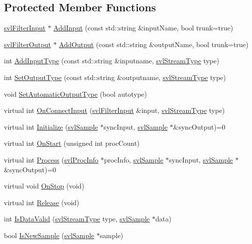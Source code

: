 \subsection*{Protected Member Functions}
\begin{DoxyCompactItemize}
\item 
\hyperlink{classsvl_filter_input}{svl\-Filter\-Input} $\ast$ \hyperlink{classsvl_filter_base_adce77c7bb49b299969eb0e00424a21de}{Add\-Input} (const std\-::string \&input\-Name, bool trunk=true)
\item 
\hyperlink{classsvl_filter_output}{svl\-Filter\-Output} $\ast$ \hyperlink{classsvl_filter_base_ac18bdc542bce9ef47ee7f612fb258041}{Add\-Output} (const std\-::string \&output\-Name, bool trunk=true)
\item 
int \hyperlink{classsvl_filter_base_abf749c32928ce1a0508b92aa2f15db32}{Add\-Input\-Type} (const std\-::string \&inputname, \hyperlink{svl_definitions_8h_aa00696d338a58db361335a01fd11e122}{svl\-Stream\-Type} type)
\item 
int \hyperlink{classsvl_filter_base_a5c51974427db1f5b8ec126c8c80fa1d7}{Set\-Output\-Type} (const std\-::string \&outputname, \hyperlink{svl_definitions_8h_aa00696d338a58db361335a01fd11e122}{svl\-Stream\-Type} type)
\item 
void \hyperlink{classsvl_filter_base_a3f8963a400373d4cd0957d3fc796ac10}{Set\-Automatic\-Output\-Type} (bool autotype)
\item 
virtual int \hyperlink{classsvl_filter_base_a7716e657fb8b592cbf31ad78cdb4c0e7}{On\-Connect\-Input} (\hyperlink{classsvl_filter_input}{svl\-Filter\-Input} \&input, \hyperlink{svl_definitions_8h_aa00696d338a58db361335a01fd11e122}{svl\-Stream\-Type} type)
\item 
virtual int \hyperlink{classsvl_filter_base_ac8eddcd9336c2b381facc8fb372e3bfb}{Initialize} (\hyperlink{classsvl_sample}{svl\-Sample} $\ast$sync\-Input, \hyperlink{classsvl_sample}{svl\-Sample} $\ast$\&sync\-Output)=0
\item 
virtual int \hyperlink{classsvl_filter_base_ad94fe80295839717e45117031e5cf60d}{On\-Start} (unsigned int proc\-Count)
\item 
virtual int \hyperlink{classsvl_filter_base_aaff77d711088384d00e717fb4ec88aab}{Process} (\hyperlink{structsvl_proc_info}{svl\-Proc\-Info} $\ast$proc\-Info, \hyperlink{classsvl_sample}{svl\-Sample} $\ast$sync\-Input, \hyperlink{classsvl_sample}{svl\-Sample} $\ast$\&sync\-Output)=0
\item 
virtual void \hyperlink{classsvl_filter_base_adf99599f927bf2934c9b4059e9dc2ed1}{On\-Stop} (void)
\item 
virtual int \hyperlink{classsvl_filter_base_ab689b852e2cee497fcd0ca6708105e17}{Release} (void)
\item 
int \hyperlink{classsvl_filter_base_ab26bdd0871500e75ceb34fe82da700ed}{Is\-Data\-Valid} (\hyperlink{svl_definitions_8h_aa00696d338a58db361335a01fd11e122}{svl\-Stream\-Type} type, \hyperlink{classsvl_sample}{svl\-Sample} $\ast$data)
\item 
bool \hyperlink{classsvl_filter_base_ab01958fc3c5ea21c49599e1dc40ac2ee}{Is\-New\-Sample} (\hyperlink{classsvl_sample}{svl\-Sample} $\ast$sample)
\end{DoxyCompactItemize}
